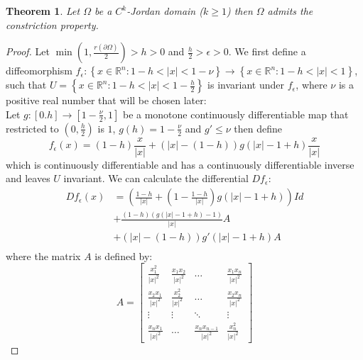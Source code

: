 \documentclass[11pt,a4paper,leqno]{report}
\newtheorem{theorem}{Theorem}[chapter]
\numberwithin{equation}{chapter}
\begin{document}
\begin{theorem} Let $\Omega$ be a $C^k$-Jordan domain ($k\geq 1$) then $\Omega$ admits the constriction property.
\end{theorem}
\begin{proof}
Let $\min(1,\frac{r(\partial\Omega)}{2})>h>0$ and $\frac{h}{2}>\epsilon>0$. We first define a diffeomorphism $f_\epsilon:\left\{x\in\mathbb{R}^n:1-h<|x|<1-\nu\right\}\rightarrow\left\{x\in\mathbb{R}^n:1-h<|x|<1\right\}$, such that $U=\left\{x\in\mathbb{R}^n: 1-h<|x|<1-\frac{h}{2}\right\}$ is invariant under $f_\epsilon$, where $\nu$ is a positive real number that will be chosen later:\\
Let $g:[0.h]\rightarrow [1-\frac{\nu}{2},1]$ be a monotone continuously differentiable map that restricted to $(0,\frac{h}{2})$ is $1$, $g(h)=1-\frac{\nu}{2}$ and $g\prime\leq\nu$  then define 
\begin{equation*}f_\epsilon(x)=(1-h)\frac{x}{|x|}+(|x|-(1-h))g(|x|-1+h)\frac{x}{|x|}\end{equation*}
which is continuously differentiable and has a continuously differentiable inverse and leaves $U$ invariant. We can calculate the differential $Df_\epsilon$:
\begin{align*}Df_\epsilon(x)&=(\frac{1-h}{|x|}+(1-\frac{1-h}{|x|})g(|x|-1+h))Id\\
&+\frac{(1-h)(g(|x|-1+h)-1)}{|x|}A\\
&+(|x|-(1-h))g\prime(|x|-1+h)A\\\end{align*}
where the matrix $A$ is defined by:
\begin{equation*}A=\begin{bmatrix}
\frac{x_1^2}{|x|^2}	& \frac{x_1x_2}{|x|^2}	& \dots	 & \frac{x_1x_n}{|x|^2}    \\
\frac{x_2x_1}{|x|^2}	& \frac{x_2^2}{|x|^2} 	& \dots  & \frac{x_2x_n}{|x|^2} 	  \\
\vdots	& \vdots  	& \ddots & \vdots \\
\frac{x_nx_1}{|x|^2} 	& \dots & \frac{x_nx_{n-1}}{|x|^2}	 & \frac{x_n^2}{|x|^2}
\end{bmatrix}\end{equation*}

\end{proof}
\end{document}

